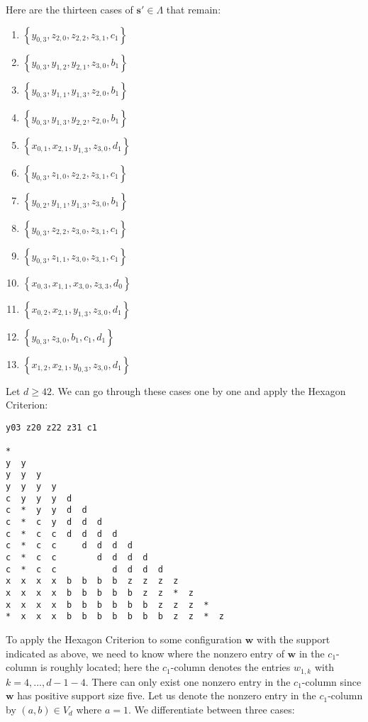 Here are the thirteen cases of \( \mathbf{s}' \in \Lambda \) that remain:
\begin{enumerate}
    \item \( \left\{ y_{0,3}, z_{2,0}, z_{2,2}, z_{3,1}, c_1 \right\} \)
    \item \( \left\{ y_{0,3}, y_{1,2}, y_{2,1}, z_{3,0}, b_1 \right\} \)
    \item \( \left\{ y_{0,3}, y_{1,1}, y_{1,3}, z_{2,0}, b_1 \right\} \)
    \item \( \left\{ y_{0,3}, y_{1,3}, y_{2,2}, z_{2,0}, b_1 \right\} \)
    \item \( \left\{ x_{0,1}, x_{2,1}, y_{1,3}, z_{3,0}, d_1 \right\} \)
    \item \( \left\{ y_{0,3}, z_{1,0}, z_{2,2}, z_{3,1}, c_1 \right\} \)
    \item \( \left\{ y_{0,2}, y_{1,1}, y_{1,3}, z_{3,0}, b_1 \right\} \)
    \item \( \left\{ y_{0,3}, z_{2,2}, z_{3,0}, z_{3,1}, c_1 \right\} \)
    \item \( \left\{ y_{0,3}, z_{1,1}, z_{3,0}, z_{3,1}, c_1 \right\} \)
    \item \( \left\{ x_{0,3}, x_{1,1}, x_{3,0}, z_{3,3}, d_0 \right\} \)
    \item \( \left\{ x_{0,2}, x_{2,1}, y_{1,3}, z_{3,0}, d_1 \right\} \)
    \item \( \left\{ y_{0,3}, z_{3,0}, b_1, c_1, d_1 \right\} \)
    \item \( \left\{ x_{1,2}, x_{2,1}, y_{0,3}, z_{3,0}, d_1 \right\} \)
\end{enumerate}
Let \( d \geq 42 \). We can go through these cases one by one and apply the Hexagon Criterion:
\begin{verbatim}
y03 z20 z22 z31 c1

*  
y  y  
y  y  y  
y  y  y  y  
c  y  y  y  d  
c  *  y  y  d  d  
c  *  c  y  d  d  d  
c  *  c  c  d  d  d  d  
c  *  c  c     d  d  d  d  
c  *  c  c        d  d  d  d  
c  *  c  c           d  d  d  d  
x  x  x  x  b  b  b  b  z  z  z  z  
x  x  x  x  b  b  b  b  b  z  z  *  z  
x  x  x  x  b  b  b  b  b  b  z  z  z  *  
*  x  x  x  b  b  b  b  b  b  b  z  z  *  z  
\end{verbatim}
To apply the Hexagon Criterion to some configuration \( \mathbf{w} \) with the support indicated as above, we need to know where the nonzero entry of \( \mathbf{w} \) in the \( c_1 \)-column is roughly located; here the \( c_1 \)-column denotes the entries \( w_{1,k} \) with \( k = 4, \dots, d - 1 - 4 \). There can only exist one nonzero entry in the \( c_1 \)-column since \( \mathbf{w} \) has positive support size five. Let us denote the nonzero entry in the \( c_1 \)-column by \( (a,b) \in V_d \) where \( a = 1 \). We differentiate between three cases:

